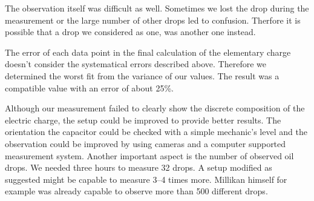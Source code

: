 \documentclass[a4paper,10pt]{article}
\begin{document}
The observation itself was difficult as well. Sometimes we lost the drop during the measurement or the large number of other drops led to confusion. Therfore it is possible that a drop we considered as one, was another one instead.

The error of each data point in the final calculation of the elementary charge doesn't consider the systematical errors described above. Therefore we determined the worst fit from the variance of our values. The result was a compatible value with an error of about 25\%.

Although our measurement failed to clearly show the discrete composition of the electric charge, the setup could be improved to provide better results. The orientation the capacitor could be checked with a simple mechanic's level and the observation could be improved by using cameras and a computer supported measurement system.  Another important aspect is the number of observed oil drops. We needed three hours to measure 32 drops. A setup modified as suggested might be capable to measure 3--4 times more. Millikan himself for example was already capable to observe more than 500 different drops.
\end{document}
